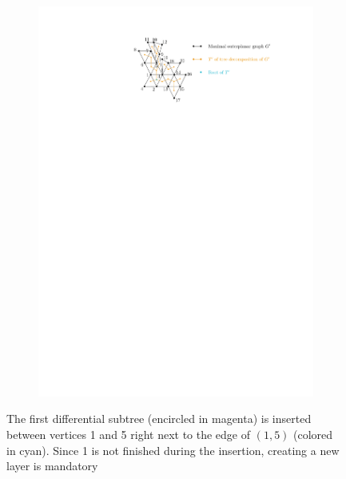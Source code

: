 \begin{figure}[H]
	\centering
	\begin{subfigure}{\textwidth}
		\centering
		\includegraphics[page=12,width=0.8\linewidth]{graphics/maximal_outerplanar_example_drawings.pdf}
	\end{subfigure}
	\caption{The first differential subtree (encircled in magenta) is inserted between vertices 1 and 5 right next to the edge of $(1,5)$ (colored in cyan). Since 1 is not finished during the insertion, creating a new layer is mandatory}
\end{figure}


